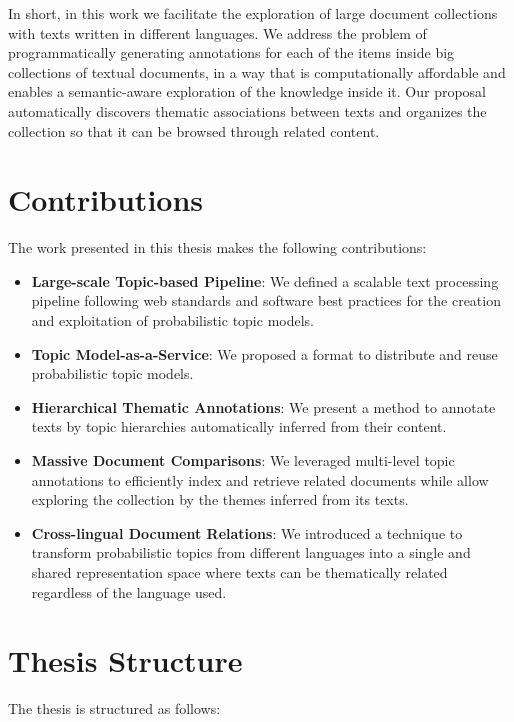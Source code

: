 
In short, in this work we facilitate the exploration of large document collections with texts written in different languages. We address the problem of programmatically generating annotations for each of the items inside big collections of textual documents, in a way that is computationally affordable and enables a semantic-aware exploration of the knowledge inside it. Our proposal automatically discovers thematic associations between texts and organizes the collection so that it can be browsed through related content.


\section{Contributions}

The work presented in this thesis makes the following contributions:

\begin{itemize}
\item \textbf{Large-scale Topic-based Pipeline}: We defined a scalable text processing pipeline following web standards and software best practices for the creation and exploitation of probabilistic topic models.
\item \textbf{Topic Model-as-a-Service}: We proposed a format to distribute and reuse probabilistic topic models.
\item \textbf{Hierarchical Thematic Annotations}: We present a method to annotate texts by topic hierarchies automatically inferred from their content.
\item \textbf{Massive Document Comparisons}: We leveraged multi-level topic annotations to efficiently index and retrieve related documents while allow exploring the collection by the themes inferred from its texts.
\item \textbf{Cross-lingual Document Relations}: We introduced a technique to transform probabilistic topics from different languages into a single and shared representation space where texts can be thematically related regardless of the language used.
\end{itemize}

\section{Thesis Structure}

The thesis is structured as follows:

